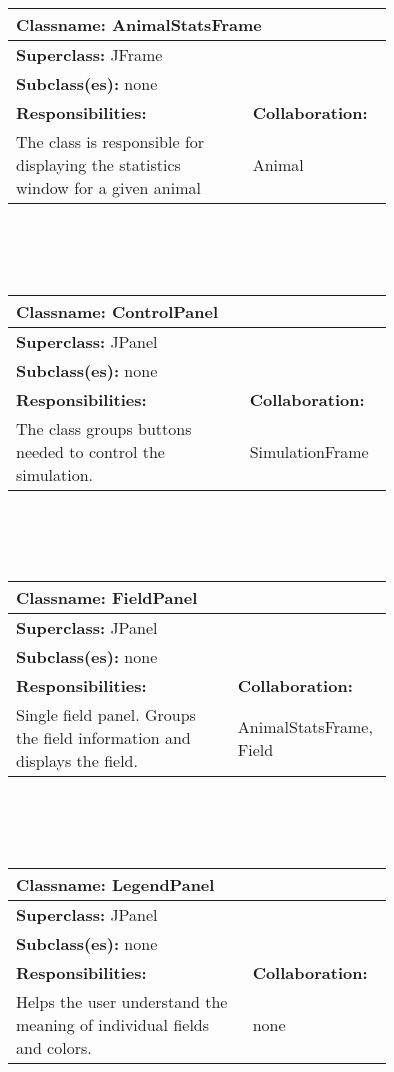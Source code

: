 \documentclass{article}
\begin{document}
\\ \\ \\
\begin{tabular}{|p{0.55\linewidth}|p{0.2\linewidth}|}
\hline
\multicolumn{2}{|l|}{\textbf{Classname:} AnimalStatsFrame} \\
\hline
\multicolumn{2}{|l|}{\textbf{Superclass:} JFrame} \\
\multicolumn{2}{|l|}{\textbf{Subclass(es):} none} \\
\hline
\textbf{Responsibilities:}  &  \textbf{Collaboration:} \\
The class is responsible for displaying the statistics window for a given animal & Animal \\
\hline
\end{tabular}
\\ \\ \\
\begin{tabular}{|p{0.55\linewidth}|p{0.2\linewidth}|}
\hline
\multicolumn{2}{|l|}{\textbf{Classname:} ControlPanel} \\
\hline
\multicolumn{2}{|l|}{\textbf{Superclass:} JPanel} \\
\multicolumn{2}{|l|}{\textbf{Subclass(es):} none} \\
\hline
\textbf{Responsibilities:}  &  \textbf{Collaboration:} \\
The class groups buttons needed to control the simulation. & SimulationFrame \\
\hline
\end{tabular}
\\ \\ \\
\begin{tabular}{|p{0.55\linewidth}|p{0.2\linewidth}|}
\hline
\multicolumn{2}{|l|}{\textbf{Classname:} FieldPanel} \\
\hline
\multicolumn{2}{|l|}{\textbf{Superclass:} JPanel} \\
\multicolumn{2}{|l|}{\textbf{Subclass(es):} none} \\
\hline
\textbf{Responsibilities:}  &  \textbf{Collaboration:} \\
Single field panel. Groups the field information and displays the field. & AnimalStatsFrame, Field \\
\hline
\end{tabular}
\\ \\ \\
\begin{tabular}{|p{0.55\linewidth}|p{0.2\linewidth}|}
\hline
\multicolumn{2}{|l|}{\textbf{Classname:} LegendPanel} \\
\hline
\multicolumn{2}{|l|}{\textbf{Superclass:} JPanel} \\
\multicolumn{2}{|l|}{\textbf{Subclass(es):} none} \\
\hline
\textbf{Responsibilities:}  &  \textbf{Collaboration:} \\
Helps the user understand the meaning of individual fields and colors. & none \\
\hline
\end{tabular}
\end{document}
